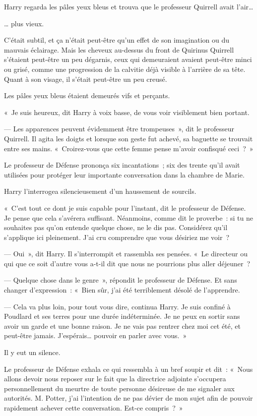 Harry regarda les pâles yeux bleus et trouva que le professeur Quirrell avait l'air…

… plus vieux.

C'était subtil, et ça n'était peut-être qu'un effet de son imagination ou du mauvais éclairage. Mais les cheveux au-dessus du front de Quirinus Quirrell s'étaient peut-être un peu dégarnis, ceux qui demeuraient avaient peut-être minci ou grisé, comme une progression de la calvitie déjà visible à l'arrière de sa tête. Quant à son visage, il s'était peut-être un peu creusé.

Les pâles yeux bleus étaient demeurés vifs et perçants.

«~Je suis heureux, dit Harry à voix basse, de vous voir visiblement bien portant.

--- Les apparences peuvent évidemment être trompeuses~», dit le professeur Quirrell. Il agita les doigts et lorsque son geste fut achevé, sa baguette se trouvait entre ses mains. «~Croirez-vous que cette femme pense m'avoir confisqué ceci~?~»

Le professeur de Défense prononça six incantations~; six des trente qu'il avait utilisées pour protéger leur importante conversation dans la chambre de Marie.

Harry l'interrogea silencieusement d'un haussement de sourcils.

«~C'est tout ce dont je suis capable pour l'instant, dit le professeur de Défense. Je pense que cela s'avérera suffisant. Néanmoins, comme dit le proverbe~: si tu ne souhaites pas qu'on entende quelque chose, ne le dis pas. Considérez qu'il s'applique ici pleinement. J'ai cru comprendre que vous désiriez me voir~?

--- Oui~», dit Harry. Il s'interrompit et rassembla ses pensées. «~Le directeur ou qui que ce soit d'autre vous a-t-il dit que nous ne pourrions plus aller déjeuner~?

--- Quelque chose dans le genre~», répondit le professeur de Défense. Et sans changer d'expression~: «~Bien sûr, j'ai été terriblement désolé de l'apprendre.

--- Cela va plus loin, pour tout vous dire, continua Harry. Je suis confiné à Poudlard et ses terres pour une durée indéterminée. Je ne peux en sortir sans avoir un garde et une bonne raison. Je ne vais pas rentrer chez moi cet été, et peut-être jamais. J'espérais… pouvoir en parler avec vous.~»

Il y eut un silence.

Le professeur de Défense exhala ce qui ressembla à un bref soupir et dit~: «~Nous allons devoir nous reposer sur le fait que la directrice adjointe s'occupera personnellement du meurtre de toute personne désireuse de me signaler aux autorités. M. Potter, j'ai l'intention de ne pas dévier de mon sujet afin de pouvoir rapidement achever cette conversation. Est-ce compris~?~»

